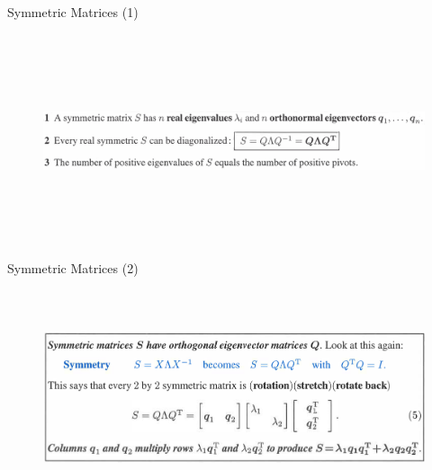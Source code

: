 \documentclass[aspectratio=169]{beamer}
\begin{document}
\begin{frame}[t]{Symmetric Matrices (1)}
\framesubtitle{}
    \begin{figure}[H]
        \centering\includegraphics[height=6cm,width=1\textwidth,keepaspectratio]{symmetric.png}
        \label{fig:symmetric.png}
    \end{figure}
\end{frame}

\begin{frame}[t]{Symmetric Matrices (2)}
    \framesubtitle{}
        \begin{figure}[H]
            \centering\includegraphics[height=6cm,width=1\textwidth,keepaspectratio]{symmetric_2.png}
            \label{fig:symmetric_2.png}
        \end{figure}
    \end{frame}

\end{document}
